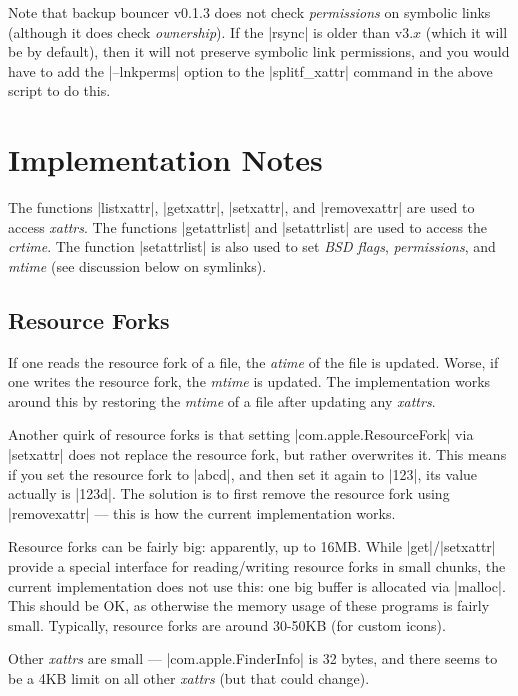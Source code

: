 \documentclass[11pt]{article}
\begin{document}
Note that backup bouncer v0.1.3 does not check \emph{permissions}
on symbolic links (although it does check \emph{ownership}).
If the |rsync| is older than v3.$x$ (which it will be by default),
then it will not preserve symbolic link permissions, and
you would have to add the |--lnkperms| option to the |splitf_xattr|
command in the above script to do this.


\section{Implementation Notes}
\label{sec-impl}


The functions |listxattr|, |getxattr|, |setxattr|, and 
|removexattr| are used to access
\emph{xattrs}.  
The functions |getattrlist| and |setattrlist| are used to access the
\emph{crtime}.  
The function |setattrlist| is also used to set \emph{BSD flags},
\emph{permissions}, and \emph{mtime} (see discussion below on symlinks).


\subsection{Resource Forks}
        
If one reads the resource fork of a file, the \emph{atime} 
of the file is updated.
Worse, if one writes the resource fork, the \emph{mtime} is updated.  
The
implementation works around this by restoring the \emph{mtime} of a file after
updating any \emph{xattrs}.

Another quirk of resource forks is that setting |com.apple.ResourceFork| via
|setxattr| does not replace the resource fork, but rather overwrites it.  This
means if you set the resource fork to |abcd|, and then set it again to |123|,
its value actually is |123d|.   The solution is to first remove the resource
fork using |removexattr| ---
this is how the current implementation works.

Resource forks can be fairly big: apparently, up to 16MB.  While 
|get|/|setxattr|
provide a special interface for reading/writing resource forks in small chunks,
the current implementation does not use this:  one big buffer is allocated via
|malloc|.  This should be OK, as otherwise the memory usage of these programs is
fairly small.  Typically, resource forks are around 30-50KB (for custom icons).

Other \emph{xattrs} are small --- |com.apple.FinderInfo| is 32 bytes, 
and there seems to
be a 4KB limit on all other \emph{xattrs} (but that could change).
\end{document}
